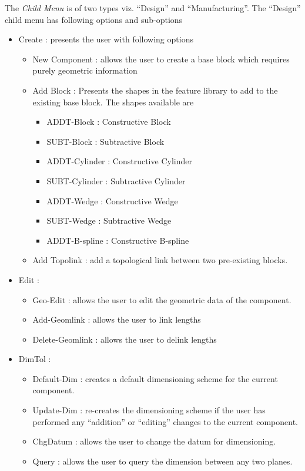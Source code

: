 		The {\em Child Menu} is of two types viz. ``Design'' and 
		``Manufacturing''.
		The ``Design'' child menu has following options and sub-options
			\begin{itemize}
			\item
			Create : presents the user with following options
				\begin{itemize}
				\item
				New Component : allows the user to create a base block which
				requires purely geometric information
				\item
				Add Block : Presents the shapes in the feature library
				to add to the existing base block. The shapes available are
				\begin{itemize}
				\item
				ADDT-Block : Constructive Block
				\item
				SUBT-Block : Subtractive Block
				\item
				ADDT-Cylinder : Constructive Cylinder
				\item
				SUBT-Cylinder : Subtractive Cylinder
				\item
				ADDT-Wedge : Constructive Wedge
				\item
				SUBT-Wedge : Subtractive Wedge
				\item
				ADDT-B-spline : Constructive B-spline
				\end{itemize}
				\item
				Add Topolink : add a topological link between two pre-existing
				blocks.
				\end{itemize}
			\item
			Edit : 
				\begin{itemize}
				\item
				Geo-Edit : allows the user to edit the geometric data of the 
				component.
				\item
				Add-Geomlink : allows the user to link lengths
				\item
				Delete-Geomlink : allows the user to delink lengths
				\end{itemize}
			\item
			DimTol :
				\begin{itemize}
				\item
				Default-Dim : creates a default dimensioning scheme for the
				current component.
				\item
				Update-Dim : re-creates the dimensioning scheme if the user has
				performed any ``addition'' or ``editing'' changes to the 
				current component.
				\item
				ChgDatum : allows the user to change the datum for dimensioning.
				\item
				Query : allows the user to query the dimension between any two
				planes.
				\end{itemize}
				
			\end{itemize}

